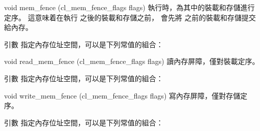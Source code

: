 void mem_fence (cl_mem_fence_flags flags) 
\stopbuffer
{}
執行時，為其中的裝載和存儲進行定序。
這意味着在執行  之後的裝載和存儲之前，
會先將  之前的裝載和存儲提交給內存。

引數  指定內存位址空間，可以是下列常值的組合：
\startigBase
\item {}
\item {}
\stopigBase
\stopbuffer

void read_mem_fence (cl_mem_fence_flags flags)
\stopbuffer
{}
讀內存屏障，僅對裝載定序。

引數  指定內存位址空間，可以是下列常值的組合：
\startigBase
\item {}
\item {}
\stopigBase
\stopbuffer

void write_mem_fence (cl_mem_fence_flags flags)
\stopbuffer
{}
寫內存屏障，僅對存儲定序。

引數  指定內存位址空間，可以是下列常值的組合：
\startigBase
\item {}
\item {}
\stopigBase
\stopbuffer


\startCLFD
{}
\stopCLFD
